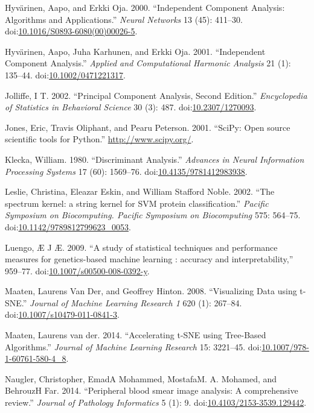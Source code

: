 \documentclass[]{article}
\begin{document}
Hyv{ä}rinen, Aapo, and Erkki Oja. 2000. ``Independent Component
Analysis: Algorithms and Applications.'' \emph{Neural Networks} 13 (45):
411--30.
doi:\href{http://dx.doi.org/10.1016/S0893-6080(00)00026-5}{10.1016/S0893-6080(00)00026-5}.

Hyv{ä}rinen, Aapo, Juha Karhunen, and Erkki Oja. 2001. ``Independent
Component Analysis.'' \emph{Applied and Computational Harmonic Analysis}
21 (1): 135--44.
doi:\href{http://dx.doi.org/10.1002/0471221317}{10.1002/0471221317}.

Jolliffe, I T. 2002. ``Principal Component Analysis, Second Edition.''
\emph{Encyclopedia of Statistics in Behavioral Science} 30 (3): 487.
doi:\href{http://dx.doi.org/10.2307/1270093}{10.2307/1270093}.

Jones, Eric, Travis Oliphant, and Pearu Peterson. 2001. ``SciPy: Open
source scientific tools for Python.'' \url{http://www.scipy.org/}.

Klecka, William. 1980. ``Discriminant Analysis.'' \emph{Advances in
Neural Information Processing Systems} 17 (60): 1569--76.
doi:\href{http://dx.doi.org/10.4135/9781412983938}{10.4135/9781412983938}.

Leslie, Christina, Eleazar Eskin, and William Stafford Noble. 2002.
``The spectrum kernel: a string kernel for SVM protein classification.''
\emph{Pacific Symposium on Biocomputing. Pacific Symposium on
Biocomputing} 575: 564--75.
doi:\href{http://dx.doi.org/10.1142/9789812799623_0053}{10.1142/9789812799623\_0053}.

Luengo, {Æ} J {Æ}. 2009. ``A study of statistical techniques and
performance measures for genetics-based machine learning : accuracy and
interpretability,'' 959--77.
doi:\href{http://dx.doi.org/10.1007/s00500-008-0392-y}{10.1007/s00500-008-0392-y}.

Maaten, Laurens Van Der, and Geoffrey Hinton. 2008. ``Visualizing Data
using t-SNE.'' \emph{Journal of Machine Learning Research 1} 620 (1):
267--84.
doi:\href{http://dx.doi.org/10.1007/s10479-011-0841-3}{10.1007/s10479-011-0841-3}.

Maaten, Laurens van der. 2014. ``Accelerating t-SNE using Tree-Based
Algorithms.'' \emph{Journal of Machine Learning Research} 15: 3221--45.
doi:\href{http://dx.doi.org/10.1007/978-1-60761-580-4_8}{10.1007/978-1-60761-580-4\_8}.

Naugler, Christopher, EmadA Mohammed, MostafaM. A. Mohamed, and BehrouzH
Far. 2014. ``Peripheral blood smear image analysis: A comprehensive
review.'' \emph{Journal of Pathology Informatics} 5 (1): 9.
doi:\href{http://dx.doi.org/10.4103/2153-3539.129442}{10.4103/2153-3539.129442}.
\end{document}
